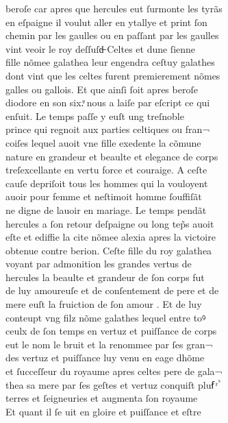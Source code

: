 \documentclass[12pt]{article}
\begin{document}
\newpage
beroſe
          car apres que hercules eut ſurmonte les
            tyrãs\\
en eſpaigne il voulut aller en ytallye et print ſon\\
chemin
          par les gaulles ou en paſſant par les gaulles\\
vint veoir le roy deſſuſd̶
            Celtes et dune ſienne\\
fille nõmee galathea leur engendra ceſtuy galathes\\
dont vint que les celtes furent premierement nõmes\\
galles ou gallois. Et que ainſi ſoit apres beroſe\\
diodore en
          son six.ͤ nous a laiſe par eſcript ce
            qui\\
enſuit. Le temps paſſe y euſt ung treſnoble\\
prince qui regnoit
          aux parties celtiques ou fran¬\\
coiſes lequel auoit vne fille exedente la
            cõmune\\
nature en grandeur et beaulte et elegance de corps\\
treſexcellante en vertu force et couraige. A ceſte\\
cauſe depriſoit tous les
          hommes qui la vouloyent\\
auoir pour femme et neſtimoit homme ſouffiſãt\\
ne digne de lauoir en mariage. Le temps pendãt\\
hercules a ſon retour deſpaigne ou long tep̃s
            auoit\\
eſte et ediffie la cite nõmee alexia apres la victoire\\
obtenue contre berion. Ceſte fille du roy
            galathea\\
voyant par admonition les
          grandes vertus de\\
hercules la
          beaulte et grandeur de ſon corps fut\\
de luy amoureuſe et de conſentement de
          pere et de\\
mere euſt la fruiction de ſon amour . Et de luy\\
conteupt
          vng filz nõme galathes lequel entre toꝰ\\
ceulx de ſon temps en vertuz et puiſſance de corps\\
eut le nom le bruit et la
          renommee par ſes gran¬\\
des vertuz et puiſſance luy venu en eage dhõme\\
et ſucceſſeur du royaume apres celtes pere de
            gala¬\\
thea sa mere par ſes geſtes et
          vertuz conquiſt pluẜ ͬ ᷤ\\
terres et ſeigneuries et augmenta ſon royaume\\
Et quant il ſe uit en gloire et puiſſance et eſtre
\end{document}
